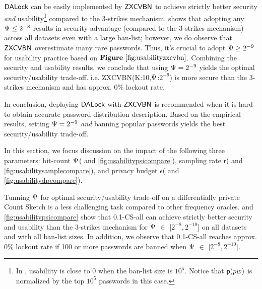 $\mathsf{DALock}$ can be easily implemented by $\mathsf{ZXCVBN}$ to achieve strictly better security \textit{and} usability\footnote{In , usabiliity is close to 0 when the ban-list size is $10^5$. Notice that $\textsf{p}(pw)$ is normalized by the top $10^5$ passwords in this case.} compared to the 3-strikes mechanism.  shows that adopting any $\Psi \le 2^{-8}$ results in security advantage (compared to the 3-strikes mechanism) across all datasets even with a large ban-list; however, we do observe that $\mathsf{ZXCVBN}$ overestimate many rare passwords. Thus, it's crucial to adopt $\Psi \ge 2^{-9}$ for usability practice based on $\lazyref{Figure}{fig:usabilityzxcvbn}$. Combining the security and usability results, we conclude that using $\Psi = 2^{-9}$ yields the optimal security/usability trade-off. i.e. ZXCVBN(K:10,$\Psi$:$2^{-9}$) is more secure than the 3-strikes mechanism and has approx. 0\% lockout rate.

In conclusion, deploying $\mathsf{DALock}$ with $\mathsf{ZXCVBN}$ is recommended when it is hard to obtain accurate password distribution description. Based on the empirical results, setting $\Psi = 2^{-9}$ \textit{and} banning popular passwords yields the best security/usability trade-off.

 In this section, we focus discussion on the impact of the following three parameters: hit-count $\Psi$( and \ref{fig:usabilitypsicompare}), sampling rate r( and \ref{fig:usabilitysamplecompare}), and privacy budget $\epsilon$( and \ref{fig:usabilitydpcompare}).

Tunning $\Psi$ for optimal security/usability trade-off on a differentially private Count Sketch is a less challenging task compared to other frequency oracles.  and \ref{fig:usabilitypsicompare} show that 0.1-CS-all can achieve strictly better security and usability than the 3-strikes mechanism for $\Psi$ $\in$ [$2^{-8},2^{-10}$] on all datasets and with all ban-list sizes. In addition, we observe that 0.1-CS-all reaches approx. 0\% lockout rate if 100 or more passwords are banned when $\Psi$ $\in$ [$2^{-8},2^{-10}$]. 

